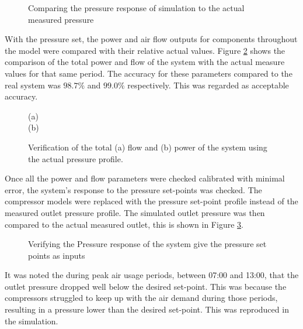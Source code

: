 	\begin{figure}[h]
		\centering
		\fbox{}
		\caption{Comparing the pressure response of simulation to the actual measured pressure}
		\label{fig: Verification Pressure kusasalethu}
	\end{figure}

 	With the pressure set, the power and air flow outputs for components throughout the model were compared with their relative actual values. Figure \ref{fig: Verification Power kusasalethu} shows the comparison of the total power and flow of the system with the actual measure values for that same period. The accuracy for these parameters compared to the real system was $98.7 \%$ and $99.0 \%$ respectively. This was regarded as acceptable accuracy. 
 
	\begin{figure}[h]
		\centering
		\fbox{}
		(a)\\
		\fbox{}
		(b)\\
		\caption{Verification of the total (a) flow and (b) power of the system using the actual pressure profile.}
		\label{fig: Verification Power kusasalethu}
	\end{figure}

	Once all the power and flow parameters were checked calibrated with minimal error, the system's response to the pressure set-points was checked. The compressor models were replaced with the pressure set-point profile instead of the measured outlet pressure profile. The simulated outlet pressure was then compared to the actual measured outlet, this is shown in Figure \ref{fig: Verification Pressure kusasalethu Setpoint}.

	\begin{figure}[h]
		\centering
		\fbox{}
		\caption{Verifying the Pressure response of the system give the pressure set points as inputs}
		\label{fig: Verification Pressure kusasalethu Setpoint}
	\end{figure}
	\par 
	It was noted the during peak air usage periods, between 07:00 and 13:00, that the outlet pressure dropped well below the desired set-point. This was because the compressors struggled to keep up with the air demand during those periods, resulting in a pressure lower than the desired set-point. This was reproduced in the simulation.
